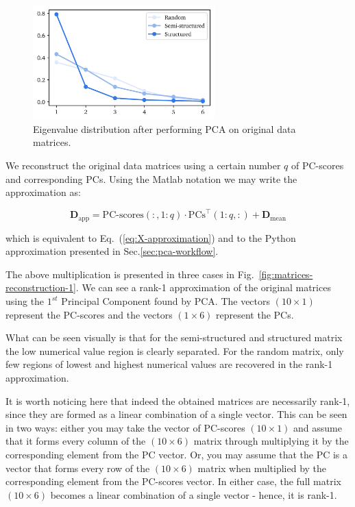 \documentclass[10pt,twocolumn]{article}
\begin{document}
\begin{figure}[H]
\centering\includegraphics[width=7cm]{matrix-reconstruction-eigenvalues-comparison.png}
\caption{Eigenvalue distribution after performing PCA on original data matrices.}			
\label{fig:eigenvalues}
\end{figure}

We reconstruct the original data matrices using a certain number $q$ of PC-scores and corresponding PCs. Using the Matlab notation we may write the approximation as:

\begin{equation} \label{eq:data-set-approximation}
\mathbf{D}_{\text{app}} = \text{PC-scores}(:,1:q) \cdot \text{PCs}^{\top}(1:q,:) + \mathbf{D}_{\text{mean}}
\end{equation}

which is equivalent to Eq.~(\ref{eq:X-approximation}) and to the Python approximation presented in Sec.\ref{sec:pca-workflow}.

The above multiplication is presented in three cases in Fig.~\ref{fig:matrices-reconstruction-1}. We can see a rank-1 approximation of the original matrices using the $1^{st}$ Principal Component found by PCA. The vectors $(10 \times 1)$ represent the PC-scores and the vectors $(1 \times 6)$ represent the PCs.

What can be seen visually is that for the semi-structured and structured matrix the low numerical value region is clearly separated. For the random matrix, only few regions of lowest and highest numerical values are recovered in the rank-1 approximation.


It is worth noticing here that indeed the obtained matrices are necessarily rank-1, since they are formed as a linear combination of a single vector. This can be seen in two ways: either you may take the vector of PC-scores $(10 \times 1)$ and assume that it forms every column of the $(10 \times 6)$ matrix through multiplying it by the corresponding element from the PC vector. Or, you may assume that the PC is a vector that forms every row of the $(10 \times 6)$ matrix when multiplied by the corresponding element from the PC-scores vector. In either case, the full matrix $(10 \times 6)$ becomes a linear combination of a single vector - hence, it is rank-1.
\end{document}
